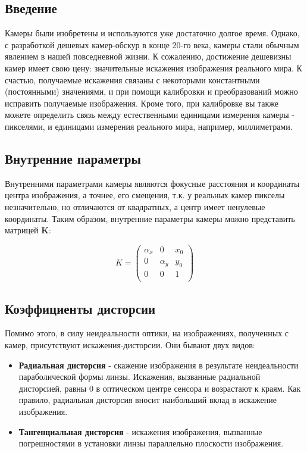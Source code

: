 \subsection{Введение}
	Камеры были изобретены и используются уже достаточно долгое время. Однако, с разработкой дешевых камер-обскур в конце 20-го века, камеры стали обычным явлением в нашей повседневной жизни. К сожалению, достижение дешевизны камер имеет свою цену: значительные искажения изображения реального мира. К счастью, получаемые искажения связаны с некоторыми константными (постоянными) значениями, и при помощи калибровки и преобразований можно исправить получаемые изображения. Кроме того, при калибровке вы также можете определить связь между естественными единицами измерения камеры - пикселями, и единицами измерения реального мира, например, миллиметрами.

\subsection{Внутренние параметры}
	Внутренними параметрами камеры являются фокусные расстояния и координаты центра изображения, а точнее, его смещения, т.к. у реальных камер пикселы незначительно, но отличаются от квадратных, а центр имеет ненулевые координаты. Таким образом, внутренние параметры камеры можно представить матрицей \textbf{K}:

	\[
		K = 
		\begin{pmatrix}
			\alpha _x & 0         & x_0 \\
			0         & \alpha _y & y_0 \\
			0         & 0 		  & 1   \\
		\end{pmatrix}
	\]
	
\subsection{Коэффициенты дисторсии}
	Помимо этого, в силу неидеальности оптики, на изображениях, полученных с камер, присутствуют искажения-дисторсии. Они бывают двух видов:
	\begin{itemize}
		\item \textbf{Радиальная дисторсия} - скажение изображения в результате неидеальности параболической формы линзы. Искажения, вызванные радиальной дисторсией, равны 0 в оптическом центре сенсора и возрастают к краям. Как правило, радиальная дисторсия вносит наибольший вклад в искажение изображения.
		
		\item \textbf{Тангенциальная дисторсия} - искажения изображения, вызванные погрешностями в установки линзы параллельно плоскости изображения.
	\end{itemize}
	

